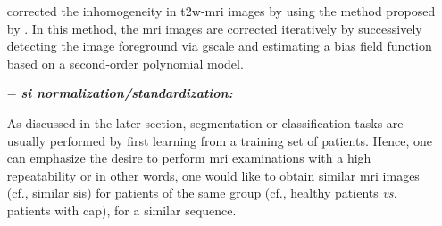 \begin{enumerate}[leftmargin=*]
\cite{Lv2009} corrected the inhomogeneity in \ac{t2w}-\ac{mri} images by using the method proposed by \cite{Madabhushi2006}. In this method, the \ac{mri} images are corrected iteratively by successively detecting the image foreground via \ac{gscale} and estimating a bias field function based on a second-order polynomial model.%
%
%
%
%
%

\item[$-$] \textbf{\textit{\Ac{si} normalization/standardization:}}

As discussed in the later section, segmentation or classification tasks are usually performed by first learning from a training set of patients. Hence, one can emphasize the desire to perform \ac{mri} examinations with a high repeatability or in other words, one would like to obtain similar \ac{mri} images (cf., similar \acp{si}) for patients of the same group (cf., healthy patients \textit{vs.} patients with \ac{cap}), for a similar sequence.


\end{enumerate}
